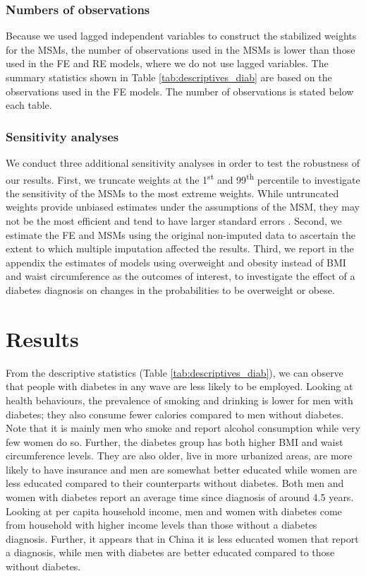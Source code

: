 \subsubsection{Numbers of observations}

Because we used lagged independent variables to construct the stabilized weights for the \acp{MSM}, the number of observations used in the \acp{MSM} is lower than those used in the \ac{FE} and \ac{RE} models, where we do not use lagged variables. The summary statistics shown in Table \ref{tab:descriptives_diab} are based on the observations used in the \ac{FE} models. The number of observations is stated below each table.

\subsubsection{Sensitivity analyses}

We conduct three additional sensitivity analyses in order to test the robustness of our results. First, we truncate weights at the 1\textsuperscript{st} and 99\textsuperscript{th} percentile to investigate the sensitivity of the \acp{MSM} to the most extreme weights. While untruncated weights provide unbiased estimates under the assumptions of the \ac{MSM}, they may not be the most efficient and tend to have larger standard errors \parencite{Cole2008}. Second, we estimate the \ac{FE} and \acp{MSM} using the original non-imputed data to ascertain the extent to which multiple imputation affected the results. Third, we report in the appendix the estimates of models using overweight and obesity instead of \ac{BMI} and waist circumference as the outcomes of interest, to investigate the effect of a diabetes diagnosis on changes in the probabilities to be overweight or obese.

\section{\label{sec:Results5}Results}

From the descriptive statistics (Table \ref{tab:descriptives_diab}), we can observe that people with diabetes in any wave are less likely to be employed. Looking at health behaviours, the prevalence of smoking and drinking is lower for men with diabetes; they also consume fewer calories compared to men without diabetes.  Note that it is mainly men who smoke and report alcohol consumption while very few women do so. Further, the diabetes group has both higher \ac{BMI} and waist circumference levels. They are also older, live in more urbanized areas, are more likely to have insurance and men are somewhat better educated while women are less educated compared to their counterparts without diabetes. Both men and women with diabetes report an average time since diagnosis of around 4.5 years. Looking at per capita household income, men and women with diabetes come from household with higher income levels than those without a diabetes diagnosis. Further, it appears that in China it is less educated women that report a diagnosis, while men with diabetes are better educated compared to those without diabetes.

